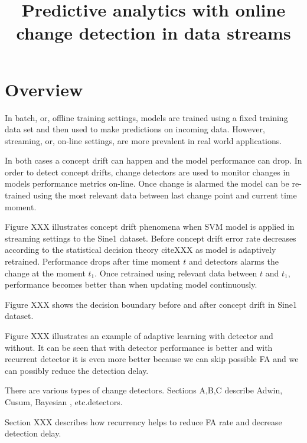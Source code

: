 \documentclass[12 pt]{article}
\title{Predictive analytics with online change detection in data streams}
\date{}
\begin{document}
	\maketitle
  \section{Overview}
  
  In batch, or, offline training settings, models are trained using a fixed training data set and then used to make predictions on incoming data. However, streaming, or, on-line settings, are more prevalent in real world applications. 

  In both cases a concept drift can happen and the model performance can drop. In order to detect concept drifts, change detectors are used to monitor changes in models performance metrics on-line. Once change is alarmed the model can be re-trained using the most relevant data between last change point and current time moment.

  Figure XXX illustrates concept drift phenomena when SVM model is applied in streaming settings to the Sine1 dataset. Before concept drift error rate decreases according to the statistical decision theory cite{XXX} as model is adaptively retrained. Performance drops after time moment $t$ and detectors alarms the change at the moment $t_1$. Once retrained using relevant data between $t$ and $t_1$, performance becomes better than when updating model continuously.

  Figure XXX shows the decision boundary before and after concept drift in Sine1 dataset.

  Figure XXX illustrates an example of adaptive learning with detector and without. It can be seen that with detector performance is better and with recurrent detector it is even more better because we can skip possible FA and we can possibly reduce the detection delay.

  There are various types of change detectors. Sections A,B,C describe Adwin, Cusum, Bayesian , etc.detectors.

  Section XXX describes how recurrency helps to reduce FA rate and decrease detection delay.
\end{document}
